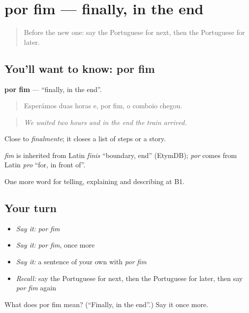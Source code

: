 \section[por fim]{por fim — finally, in the end}

\label{lesson:PT-C269-por-fim}



\begin{quote}
Before the new one: say the Portuguese for next, then the Portuguese for later.
\end{quote}

\subsection*{You'll want to know: por fim}
\textbf{por fim} — \textquotedblleft{}finally, in the end\textquotedblright{}.

\begin{quote}
Esperámos duas horas e, por fim, o comboio chegou.
\end{quote}

\begin{quote}
\emph{We waited two hours and in the end the train arrived.}
\end{quote}

Close to \emph{finalmente}; it closes a list of steps or a story.

\begin{cousinweb}
\emph{fim} is inherited from Latin \emph{fīnis} \textquotedblleft{}boundary, end\textquotedblright{} (EtymDB); \emph{por} comes from Latin \emph{pro} \textquotedblleft{}for, in front of\textquotedblright{}.
\end{cousinweb}

\begin{grammarlens}[title={What you've built}]
One more word for telling, explaining and describing at B1.
\end{grammarlens}

\subsection*{Your turn}
\begin{itemize}
\raggedright
  \item \emph{Say it:} \emph{por fim}
  \item \emph{Say it:} \emph{por fim}, once more
  \item \emph{Say it:} a sentence of your own with \emph{por fim}
  \item \emph{Recall:} say the Portuguese for next, then the Portuguese for later, then say \emph{por fim} again
\end{itemize}

\begin{tcolorbox}[breakable,colback=teal!4,colframe=teal!35!black,title={Before you move on}]
What does por fim mean? (\textquotedblleft{}Finally, in the end\textquotedblright{}.) Say it once more.
\end{tcolorbox}
